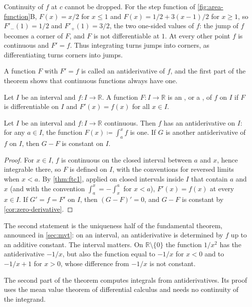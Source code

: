 Continuity of $f$ at $c$ cannot be dropped. For the step function of \cref{fig:area-function}B, $F(x)=x/2$ for $x\le1$ and $F(x)=1/2+3(x-1)/2$ for $x\ge1$, so $F'_-(1)=1/2$ and $F'_+(1)=3/2$, the two one-sided values of $f$: the jump of $f$ becomes a corner of $F$, and $F$ is not differentiable at $1$. At every other point $f$ is continuous and $F'=f$. Thus integrating turns jumps into corners, as differentiating turns corners into jumps.

A function $F$ with $F'=f$ is called an antiderivative of $f$, and the first part of the theorem shows that continuous functions always have one.

\begin{definition}[Antiderivative]
\label{def:antiderivative}
Let $I$ be an interval and $f\colon I\to\mathbb R$. A function $F\colon I\to\mathbb R$ is an , or a , of $f$ on $I$ if $F$ is differentiable on $I$ and $F'(x)=f(x)$ for all $x\in I$.
\end{definition}

\begin{corollary}
\label{cor:antiderivative}
Let $I$ be an interval and $f\colon I\to\mathbb R$ continuous. Then $f$ has an antiderivative on $I$: for any $a\in I$, the function $F(x)\coloneqq\int_a^xf$ is one. If $G$ is another antiderivative of $f$ on $I$, then $G-F$ is constant on $I$.
\end{corollary}

\begin{proof}
For $x\in I$, $f$ is continuous on the closed interval between $a$ and $x$, hence integrable there, so $F$ is defined on $I$, with the conventions for reversed limits when $x<a$. By \cref{thm:ftc1}, applied on closed intervals inside $I$ that contain $a$ and $x$ (and with the convention $\int_a^x=-\int_x^a$ for $x<a$), $F'(x)=f(x)$ at every $x\in I$. If $G'=f=F'$ on $I$, then $(G-F)'=0$, and $G-F$ is constant by \cref{cor:zero-derivative}.
\end{proof}

The second statement is the uniqueness half of the fundamental theorem, announced in \cref{sec:mvt}: on an interval, an antiderivative is determined by $f$ up to an additive constant. The interval matters. On $\mathbb R\setminus\{0\}$ the function $1/x^2$ has the antiderivative $-1/x$, but also the function equal to $-1/x$ for $x<0$ and to $-1/x+1$ for $x>0$, whose difference from $-1/x$ is not constant.

The second part of the theorem computes integrals from antiderivatives. Its proof uses the mean value theorem of differential calculus and needs no continuity of the integrand.


